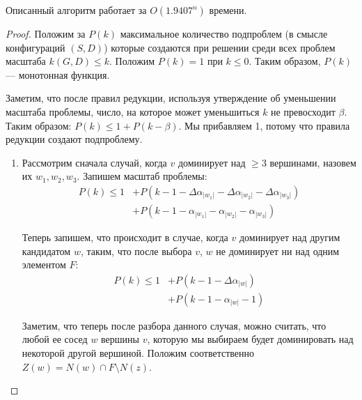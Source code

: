 \begin{theorem}
    Описанный алгоритм работает за \(O(1.9407^n)\) времени.
\end{theorem}
\begin{proof}
    Положим за \(P(k)\) максимальное количество подпроблем (в смысле конфигураций \((S, D)\)) которые создаются при решении среди всех проблем масштаба \(k(G, D) \le k\). Положим \(P(k) = 1\) при \(k \le 0\). Таким образом, \(P(k)\) --- монотонная функция.


    Заметим, что после правил редукции, используя утверждение об уменьшении масштаба проблемы, число, на которое может уменьшиться \(k\) не превосходит \(\beta\). Таким образом: \(P(k) \le 1 + P(k - \beta)\). Мы прибавляем 1, потому что правила редукции создают подпроблему.

    \begin{enumerate}[label=\Alph*]
        \item Рассмотрим сначала случай, когда \(v\) доминирует над \(\ge 3\) вершинами, назовем их \(w_1, w_2, w_3\). Запишем масштаб проблемы:
        \begin{align*}
            P(k) \le 1 &+ P(k - 1 - \Delta \alpha_{|w_1|} - \Delta \alpha_{|w_2|} - \Delta \alpha_{|w_3|}) \\
            &+ P(k - 1 - \alpha_{|w_1|} - \alpha_{|w_2|} - \alpha_{|w_3|})
        \end{align*}

        Теперь запишем, что происходит в случае, когда \(v\) доминирует над другим кандидатом \(w\), таким, что после выбора \(v\), \(w\) не доминирует ни над одним элементом \(F\):
        \begin{align*}
            P(k) \le 1 &+ P(k - 1 - \Delta \alpha_{|w|}) \\
            &+ P(k - 1 - \alpha_{|w|} - 1)
        \end{align*}

        Заметим, что теперь после разбора данного случая, можно считать, что любой ее сосед \(w\) вершины \(v\), которую мы выбираем будет доминировать над некоторой другой вершиной. Положим соответственно \(Z(w) = N(w) \cap F \setminus N(z)\).


\end{enumerate}
\end{proof}
